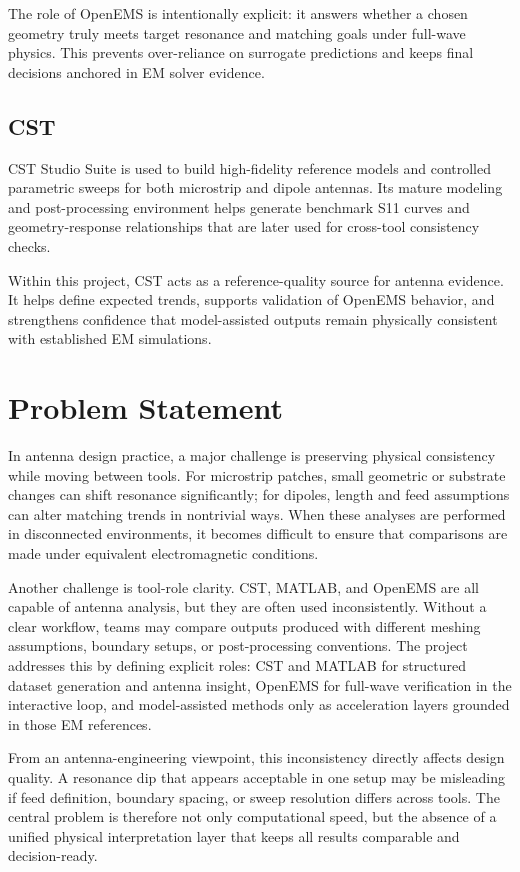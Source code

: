\documentclass[12pt,a4paper]{article}
\begin{document}
The role of OpenEMS is intentionally explicit: it answers whether a chosen geometry truly meets target resonance and matching goals under full-wave physics. This prevents over-reliance on surrogate predictions and keeps final decisions anchored in EM solver evidence.

\subsection{CST}
CST Studio Suite is used to build high-fidelity reference models and controlled parametric sweeps for both microstrip and dipole antennas. Its mature modeling and post-processing environment helps generate benchmark S11 curves and geometry-response relationships that are later used for cross-tool consistency checks.

Within this project, CST acts as a reference-quality source for antenna evidence. It helps define expected trends, supports validation of OpenEMS behavior, and strengthens confidence that model-assisted outputs remain physically consistent with established EM simulations.

\section{Problem Statement}
In antenna design practice, a major challenge is preserving physical consistency while moving between tools. For microstrip patches, small geometric or substrate changes can shift resonance significantly; for dipoles, length and feed assumptions can alter matching trends in nontrivial ways. When these analyses are performed in disconnected environments, it becomes difficult to ensure that comparisons are made under equivalent electromagnetic conditions.

Another challenge is tool-role clarity. CST, MATLAB, and OpenEMS are all capable of antenna analysis, but they are often used inconsistently. Without a clear workflow, teams may compare outputs produced with different meshing assumptions, boundary setups, or post-processing conventions. The project addresses this by defining explicit roles: CST and MATLAB for structured dataset generation and antenna insight, OpenEMS for full-wave verification in the interactive loop, and model-assisted methods only as acceleration layers grounded in those EM references.

From an antenna-engineering viewpoint, this inconsistency directly affects design quality. A resonance dip that appears acceptable in one setup may be misleading if feed definition, boundary spacing, or sweep resolution differs across tools. The central problem is therefore not only computational speed, but the absence of a unified physical interpretation layer that keeps all results comparable and decision-ready.
\end{document}

